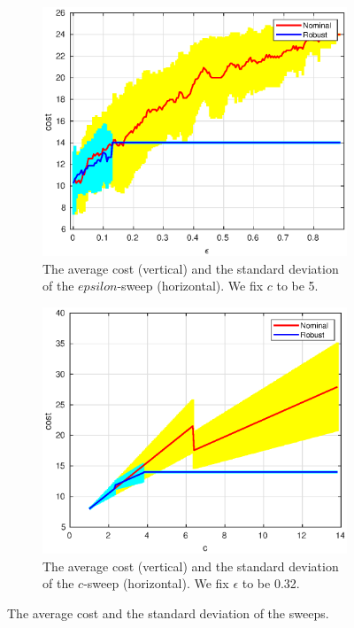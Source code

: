 \documentclass[11pt,reqno]{amsart}
\theoremstyle{definition}
\numberwithin{equation}{section}
\theoremstyle{remark}
\begin{document}
\begin{figure}
\centering
\begin{subfigure}{0.5\linewidth}
    \centering
    \includegraphics[width=0.9\linewidth]{images/curve_normal_epsilonSweep_new.eps}
    \caption{The average cost (vertical) and the standard deviation of the $epsilon$-sweep (horizontal). We fix $c$ to be 5.}
    \label{exp_curves_normal_epsilonSweep}
\end{subfigure}%
\begin{subfigure}{0.5\linewidth}
    \centering
    \includegraphics[width=0.9\linewidth]{images/curve_normal_costSweep_new.eps}
    \caption{The average cost (vertical) and the standard deviation of the $c$-sweep (horizontal). We fix $\epsilon$ to be 0.32.}
    \label{exp_curves_normal_costSweep}
\end{subfigure}
\caption{The average cost and the standard deviation of the sweeps.}
\label{exp_curves}
\end{figure}
\end{document}
